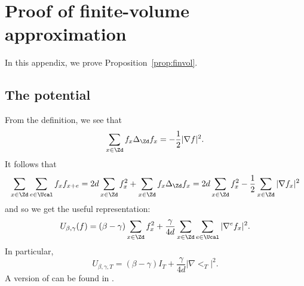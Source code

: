 
\renewcommand{\appendicesname}{Appendix}

\appendix

\chapter{Proof of finite-volume approximation}
\label{sec:finvol}

In this appendix, we prove Proposition~\ref{prop:finvol}.



\section{The potential}

From the definition, we see that
\begin{equation}
\label{e:sbp}
\sum_{x\in\Zd}   f_x \Delta_{\Zd} f_x
=
-\frac{1}{2} |\nabla f|^2.
\end{equation}
It follows that
\begin{equation}
\sum_{x\in\Zd} \sum_{e\in\Ucal} f_x f_{x+e}
=
2 d \sum_{x\in\Zd} f_x^2
+ \sum_{x\in\Zd} f_x \Delta_{\Zd} f_x
=
2 d \sum_{x\in\Zd} f_x^2
- \frac{1}{2} \sum_{x\in\Zd} |\nabla f_x|^2
\end{equation}
and so we get the useful representation:
\begin{equation}
\label{e:Udef-pos}
U_{\beta,\gamma}(f)
= (\beta - \gamma) \sum_{x\in\Zd} f_x^2
+ \frac{\gamma}{4d} \sum_{x\in\Zd} \sum_{e\in\Ucal} |\nabla^e f_x|^2.
\end{equation}
In particular,
\begin{equation}
  \label{e:V2}
  U_{\beta,\gamma,T} =
  (\beta - \gamma) I_T
  + \frac{\gamma}{4d}
  |\nabla \lt_T|^2
  .
\end{equation}
A version of  can be found in \cite{HK01a}.

